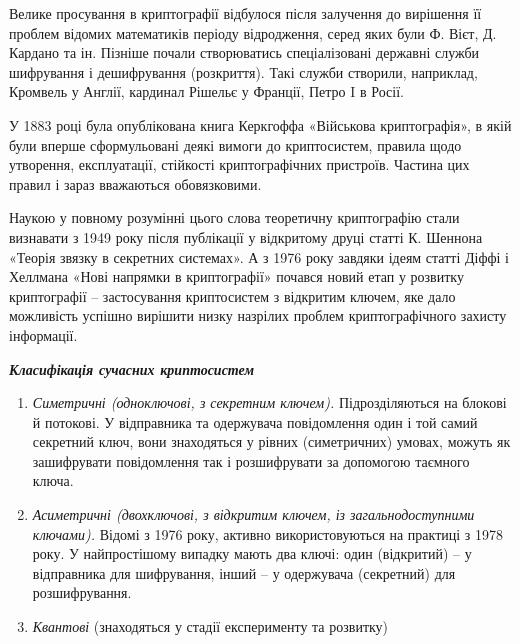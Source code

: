 \documentclass[a4paper]{article}
\newcommand\liststyleWWviiiNumxxxvi{%
\renewcommand\theenumi{\arabic{enumi}}
\renewcommand\theenumii{\arabic{enumii}}
\renewcommand\theenumiii{\arabic{enumiii}}
\renewcommand\theenumiv{\arabic{enumiv}}
\renewcommand\labelenumi{\theenumi.}
\renewcommand\labelenumii{\theenumii.}
\renewcommand\labelenumiii{\theenumiii.}
\renewcommand\labelenumiv{\theenumiv.}
}
\newcounter{}
\begin{document}
Велике просування в криптографії відбулося після залучення до вирішення її
проблем  відомих математиків періоду відродження, серед яких  були Ф. Вієт, Д.
Кардано та ін. Пізніше почали створюватись спеціалізовані державні служби
шифрування і дешифрування (розкриття). Такі служби створили, наприклад,
Кромвель у Англії, кардинал Рішельє у Франції, Петро I  в Росії. 

У 1883 році була опублікована  книга Керкгоффа «Військова криптографія», в якій 
були вперше сформульовані деякі вимоги до криптосистем, правила щодо утворення,
експлуатації, стійкості  криптографічних пристроїв. Частина цих правил і зараз
вважаються обов{\textquotesingle}язковими. 

Наукою у повному розумінні цього слова теоретичну  криптографію стали визнавати
з 1949 року після публікації у відкритому друці  статті К. Шеннона «Теорія
зв{\textquotesingle}язку в секретних системах». А з 1976 року завдяки ідеям
статті  Діффі і Хеллмана «Нові напрямки в криптографії» почався новий  етап у
розвитку  криптографії – застосування криптосистем з відкритим ключем, яке дало
можливість успішно вирішити низку назрілих  проблем криптографічного захисту
інформації.


\bigskip


\bigskip

{\centering\bfseries\itshape
Класифікація сучасних  криптосистем
\par}


\bigskip


\bigskip

\liststyleWWviiiNumxxxvi
\begin{enumerate}
\item \textit{Симетричні (одноключові, з секретним ключем).}  Підрозділяються на
блокові й потокові. У відправника та одержувача повідомлення один і той самий
секретний ключ, вони знаходяться у рівних (симетричних) умовах, можуть як
зашифрувати повідомлення так і  розшифрувати за допомогою таємного ключа.
\item \textit{Асиметричні (двохключові, з відкритим ключем, із
загальнодоступними ключами).} Відомі з 1976 року, активно використовуються на
практиці з 1978 року. У найпростішому випадку мають два ключі: один (відкритий)
– у відправника для шифрування, інший – у одержувача (секретний) для
розшифрування.
\item \textit{Квантові} (знаходяться у стадії експерименту та розвитку)
\end{enumerate}

\bigskip
\end{document}
